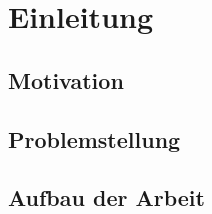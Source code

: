 \section{Einleitung}
\subsection{Motivation}
\subsection{Problemstellung}
\subsection{Aufbau der Arbeit}